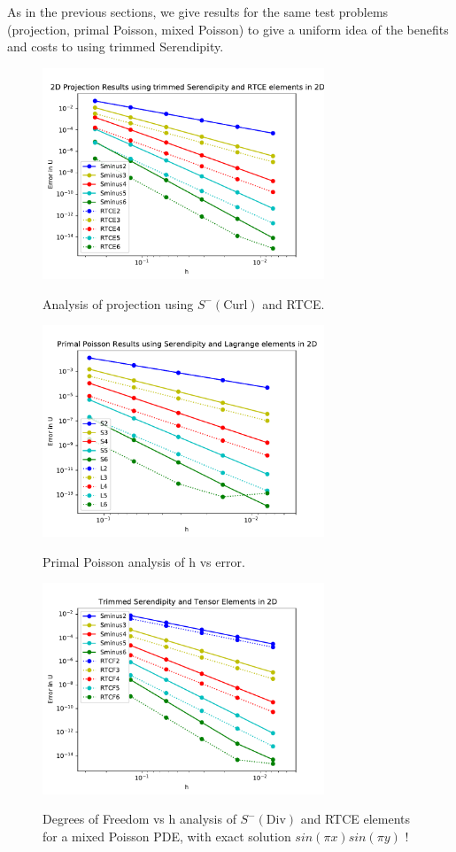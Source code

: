 \documentclass[manuscript,screen]{acmart}
\begin{document}
As in the previous sections, we give results for the same test problems (projection, primal Poisson, mixed Poisson) to give a uniform idea of the benefits and costs to using trimmed Serendipity.  

\begin{figure}[h!]
  \caption{Analysis of projection using $S^-(\text{Curl})$ and RTCE.}
  \includegraphics[width=0.75\textwidth]{2dProjectionH.pdf}
  \label{fig:2dProjectionH}
\end{figure}


\begin{figure}[h!]
  \caption{Primal Poisson analysis of h vs error.}
  \includegraphics[width=0.75\textwidth]{2dPrimalH.pdf}
  \label{fig:2dPrimalH}
\end{figure}

\begin{figure}[h!]
  \caption{Degrees of Freedom vs h analysis of $S^-(\text{Div})$ and RTCE elements for a mixed Poisson PDE, with exact solution $sin(\pi x)sin(\pi y)$ !}
  \includegraphics[width=0.75\textwidth]{2dMixedPoissonH.pdf}
  \label{fig:2dMixedPoissonH}
\end{figure}
\end{document}
